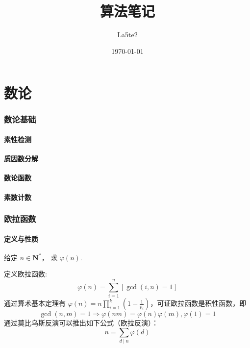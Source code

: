 \documentclass[12pt,a4paper]{article}
\title{算法笔记}
\author{La5te2}
\date{\today}
\begin{document}
	
\maketitle
\tableofcontents
\makeatletter
{} %
\makeatother
\graphicspath{{image/}}


\newpage
\part{数论}
\section{数论基础}
\subsection{素性检测}
\subsection{质因数分解}
\subsection{数论函数}
\subsection{素数计数} %
\newpage
\section{欧拉函数}
\subsection{定义与性质}
\begin{mdframed}[leftline=true, linewidth=2pt, linecolor=gray]
	给定 $n\in \mathbf{N^*}$， 求 $\varphi(n)$.
\end{mdframed}
定义欧拉函数: \begin{equation*}\displaystyle\varphi(n)=\sum_{i=1}^{n}[\gcd(i,n)=1]\end{equation*}
通过算术基本定理有 $\displaystyle \varphi(n)=n\prod^{k}_{i=1}(1-\frac{1}{p_i})$，可证欧拉函数是积性函数，即
\begin{equation*}
	\gcd(n,m)=1\Rightarrow \varphi(nm)=\varphi(n)\varphi(m),\varphi(1)=1
\end{equation*}
通过莫比乌斯反演可以推出如下公式（欧拉反演）：
\begin{equation*}
	n=\sum_{d\mid n}\varphi(d)
\end{equation*}
\end{document}
